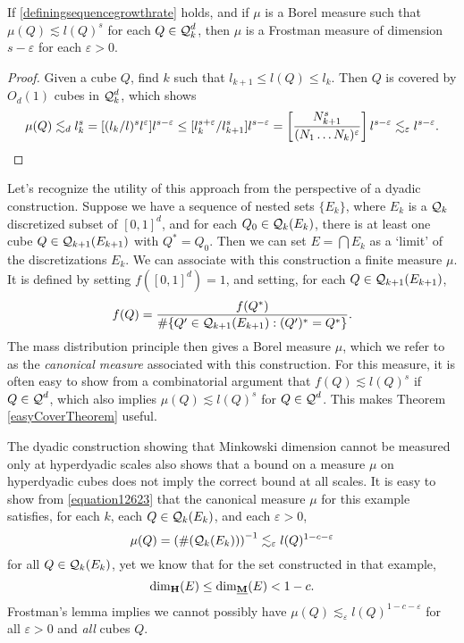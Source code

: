 \begin{theorem} \label{easyCoverTheorem}
	If \eqref{definingsequencegrowthrate} holds, and if $\mu$ is a Borel measure such that $\mu(Q) \lesssim l(Q)^s$ for each $Q \in \operatorname{\mathcal{Q}}_k^d$, then $\mu$ is a Frostman measure of dimension $s - \varepsilon$ for each $\varepsilon > 0$.
\end{theorem}
\begin{proof}
	Given a cube $Q$, find $k$ such that $l_{k+1} \leq l(Q) \leq l_k$. Then $Q$ is covered by $O_d(1)$ cubes in $\operatorname{\mathcal{Q}}^d_k$, which shows
	\[ \mu(Q) \lesssim_d l_k^s = [(l_k/l)^s l^\varepsilon ] l^{s - \varepsilon} \leq [l_k^{s + \varepsilon} / l_{k+1}^s] l^{s - \varepsilon} = \left[ \frac{N_{k+1}^s}{(N_1 \dots N_k)^\varepsilon} \right] l^{s-\varepsilon} \lesssim_\varepsilon l^{s-\varepsilon}. \qedhere \]
\end{proof}	

Let's recognize the utility of this approach from the perspective of a dyadic construction. Suppose we have a sequence of nested sets $\{ E_k \}$, where $E_k$ is a $\operatorname{\mathcal{Q}}_k$ discretized subset of $[0,1]^d$, and for each $Q_0 \in \operatorname{\mathcal{Q}}_k(E_k)$, there is at least one cube $Q \in \operatorname{\mathcal{Q}}_{k+1}(E_{k+1})$ with $Q^* = Q_0$. Then we can set $E = \bigcap E_k$ as a `limit' of the discretizations $E_k$. We can associate with this construction a finite measure $\mu$. It is defined by setting $f([0,1]^d) = 1$, and setting, for each $Q \in \operatorname{\mathcal{Q}}_{k+1}(E_{k+1})$,
%
\[ f(Q) = \frac{f(Q^*)}{\# \{ Q' \in \operatorname{\mathcal{Q}}_{k+1}(E_{k+1}) : (Q')^* = Q^* \}}. \]
%
The mass distribution principle then gives a Borel measure $\mu$, which we refer to as the \emph{canonical measure} associated with this construction. For this measure, it is often easy to show from a combinatorial argument that $f(Q) \lesssim l(Q)^s$ if $Q \in \operatorname{\mathcal{Q}}^d$, which also implies $\mu(Q) \lesssim l(Q)^s$ for $Q \in \operatorname{\mathcal{Q}}^d$. This makes Theorem \ref{easyCoverTheorem} useful.

\begin{remark}
	The dyadic construction showing that Minkowski dimension cannot be measured only at hyperdyadic scales also shows that a bound on a measure $\mu$ on hyperdyadic cubes does not imply the correct bound at all scales. It is easy to show from \eqref{equation12623} that the canonical measure $\mu$ for this example satisfies, for each $k$, each $Q \in \operatorname{\mathcal{Q}}_k(E_k)$, and each $\varepsilon > 0$,
	\[ \mu(Q) = \left( \#(\operatorname{\mathcal{Q}}_k(E_k)) \right)^{-1} \lesssim_\varepsilon l(Q)^{1-c-\varepsilon} \]
	for all $Q \in \operatorname{\mathcal{Q}}_k(E_k)$, yet we know that for the set constructed in that example,
	\[ \operatorname{\dim_{\mathbf{H}}}(E) \leq \operatorname{\dim_{\underline{\mathbf{M}}}}(E) < 1 - c. \]
	Frostman's lemma implies we cannot possibly have $\mu(Q) \lesssim_\varepsilon l(Q)^{1-c-\varepsilon}$ for all $\varepsilon > 0$ and \emph{all} cubes $Q$.
\end{remark}

